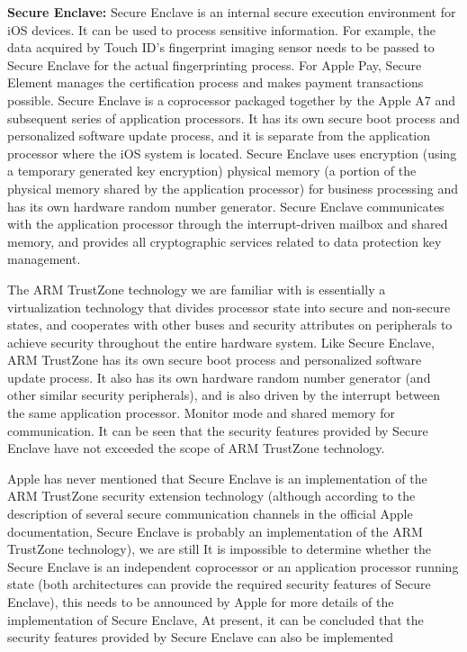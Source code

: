 \documentclass[journal]{IEEEtran}
\begin{document}
    \textbf{Secure Enclave:} Secure Enclave is an internal secure execution environment for iOS devices. It can be used to process sensitive information. For example, the data acquired by Touch ID's fingerprint imaging sensor needs to be passed to Secure Enclave for the actual fingerprinting process. For Apple Pay, Secure Element manages the certification process and makes payment transactions possible.
    Secure Enclave is a coprocessor packaged together by the Apple A7 and subsequent series of application processors. It has its own secure boot process and personalized software update process, and it is separate from the application processor where the iOS system is located. Secure Enclave uses encryption (using a temporary generated key encryption) physical memory (a portion of the physical memory shared by the application processor) for business processing and has its own hardware random number generator. Secure Enclave communicates with the application processor through the interrupt-driven mailbox and shared memory, and provides all cryptographic services related to data protection key management.

The ARM TrustZone technology we are familiar with is essentially a virtualization technology that divides processor state into secure and non-secure states, and cooperates with other buses and security attributes on peripherals to achieve security throughout the entire hardware system. Like Secure Enclave, ARM TrustZone has its own secure boot process and personalized software update process. It also has its own hardware random number generator (and other similar security peripherals), and is also driven by the interrupt between the same application processor. Monitor mode and shared memory for communication. It can be seen that the security features provided by Secure Enclave have not exceeded the scope of ARM TrustZone technology.


Apple has never mentioned that Secure Enclave is an implementation of the ARM TrustZone security extension technology (although according to the description of several secure communication channels in the official Apple documentation, Secure Enclave is probably an implementation of the ARM TrustZone technology), we are still It is impossible to determine whether the Secure Enclave is an independent coprocessor or an application processor running state (both architectures can provide the required security features of Secure Enclave), this needs to be announced by Apple for more details of the implementation of Secure Enclave, At present, it can be concluded that the security features provided by Secure Enclave can also be implemented
\end{document}
